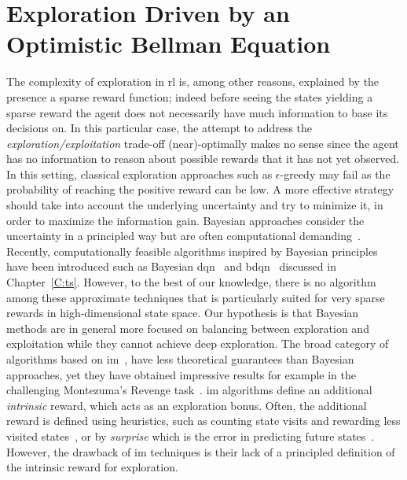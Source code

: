 \chapter{Exploration Driven by an Optimistic Bellman Equation}
The complexity of exploration in \gls{rl} is, among other reasons, explained by the presence a sparse reward function; indeed before seeing the states yielding a sparse reward the agent does not necessarily have much information to base its decisions on. In this particular case, the attempt to address the \textit{exploration/exploitation} trade-off (near)-optimally makes no
sense since the agent has no information to reason about possible
rewards that it has not yet observed. In this setting, classical exploration
approaches such as $\epsilon$-greedy may fail as the probability of
reaching the positive reward can be low. A more effective strategy
should take into account the underlying uncertainty and try to
minimize it, in order to maximize the information gain. Bayesian approaches consider the uncertainty
in a principled way but are often
computational demanding~\cite{vlassis2012bayesian,engel2005reinforcement}. Recently, computationally feasible
algorithms inspired by Bayesian principles have been
introduced such as Bayesian \gls{dqn}~\cite{azizzadenesheli2517efficient} and \gls{bdqn}~\cite{osband2017deep} discussed in Chapter~\ref{C:ts}.
However, to the best of our knowledge, there is no algorithm among these approximate techniques that is particularly suited for very sparse rewards in high-dimensional state space. Our hypothesis is that Bayesian methods are
in general more focused on balancing between exploration and
exploitation while they cannot achieve deep exploration. The broad
category of algorithms based on \gls{im}~\cite{singh2004intrinsically}, have less theoretical guarantees
than Bayesian approaches, yet they have obtained impressive results
for example in the challenging Montezuma's Revenge task~\cite{bellemare2016unifying}. \gls{im}
algorithms define an additional \textit{intrinsic} reward, which acts as an exploration bonus. Often, the additional
reward is defined using heuristics, such as counting state visits and
rewarding less visited states~\cite{ostrovski2017count}, or by
\textit{surprise} which is the error in predicting future
states~\cite{pathak2017curiosity}. However, the drawback of \gls{im} techniques is
their lack of a principled definition of the intrinsic reward for exploration.

